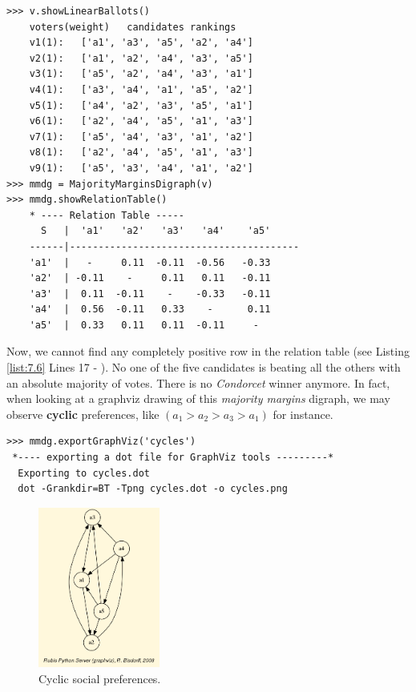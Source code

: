 \begin{lstlisting}[caption={Example of cyclic social preferences},label=list:7.6,basicstyle=\footnotesize]
>>> v.showLinearBallots()
    voters(weight)	 candidates rankings
    v1(1): 	 ['a1', 'a3', 'a5', 'a2', 'a4']
    v2(1): 	 ['a1', 'a2', 'a4', 'a3', 'a5']
    v3(1): 	 ['a5', 'a2', 'a4', 'a3', 'a1']
    v4(1): 	 ['a3', 'a4', 'a1', 'a5', 'a2']
    v5(1): 	 ['a4', 'a2', 'a3', 'a5', 'a1']
    v6(1): 	 ['a2', 'a4', 'a5', 'a1', 'a3']
    v7(1): 	 ['a5', 'a4', 'a3', 'a1', 'a2']
    v8(1): 	 ['a2', 'a4', 'a5', 'a1', 'a3']
    v9(1): 	 ['a5', 'a3', 'a4', 'a1', 'a2']
>>> mmdg = MajorityMarginsDigraph(v)
>>> mmdg.showRelationTable()
    * ---- Relation Table -----
      S   |  'a1'   'a2'   'a3'	  'a4'	  'a5'	  
    ------|----------------------------------------
    'a1'  |   -     0.11  -0.11	 -0.56	 -0.33	 
    'a2'  | -0.11    -	   0.11	  0.11	 -0.11	 
    'a3'  |  0.11  -0.11    -	 -0.33	 -0.11	 
    'a4'  |  0.56  -0.11   0.33	   -	  0.11	 
    'a5'  |  0.33   0.11   0.11	 -0.11	   -	 
\end{lstlisting}    

Now, we cannot find any completely positive row in the relation table (see Listing \ref{list:7.6} Lines 17 - ). No one of the five candidates is beating all the others with an absolute majority of votes. There is no \emph{Condorcet} winner anymore. In fact, when looking at a graphviz drawing of this \emph{majority margins} digraph, we may observe \textbf{cyclic} preferences, like $(a_1 > a_2 > a_3 > a_1)$ for instance.

\begin{lstlisting}[basicstyle=\footnotesize]
>>> mmdg.exportGraphViz('cycles')
 *---- exporting a dot file for GraphViz tools ---------*
  Exporting to cycles.dot
  dot -Grankdir=BT -Tpng cycles.dot -o cycles.png
\end{lstlisting}

\begin{figure}[h]
\sidecaption
\includegraphics[width=4cm]{Figures/cycles.png}
\caption{Cyclic social preferences.}
\label{fig:7.2}       %
\end{figure}
	   
